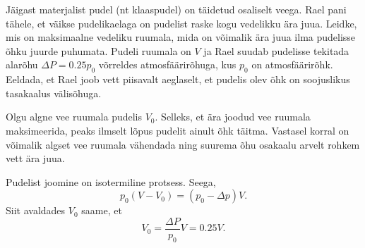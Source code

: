 
Jäigast materjalist pudel (nt klaaspudel) on täidetud osaliselt veega. Rael pani tähele, et väikse pudelikaelaga on pudelist raske kogu vedelikku ära juua. Leidke, mis on maksimaalne vedeliku ruumala, mida on võimalik ära juua ilma pudelisse õhku juurde puhumata. Pudeli ruumala on $V$ ja Rael suudab pudelisse tekitada alarõhu $\Delta P=\num{0.25} p_0$ võrreldes atmosfäärirõhuga, kus $p_0$ on atmosfäärirõhk. Eeldada, et Rael joob vett piisavalt aeglaselt, et pudelis olev õhk on soojuslikus tasakaalus välisõhuga.
	

	
\hint

\solu
Olgu algne vee ruumala pudelis $V_0$. Selleks, et ära joodud vee ruumala maksimeerida, peaks ilmselt lõpus pudelit ainult õhk täitma. Vastasel korral on võimalik algset vee ruumala vähendada ning suurema õhu osakaalu arvelt rohkem vett ära juua.

Pudelist joomine on isotermiline protsess. Seega,
\[
p_0 (V-V_0)=(p_0-\Delta p)V.
\]
Siit avaldades $V_0$ saame, et
\[
V_0=\frac{\Delta P}{p_0} V = \num{0.25} V.
\]
\probend